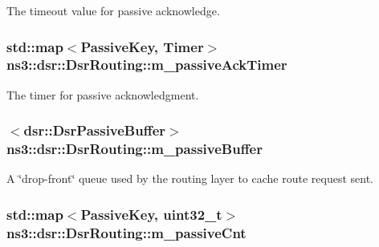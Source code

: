 The timeout value for passive acknowledge. 

\subsubsection[{\texorpdfstring{m\+\_\+passive\+Ack\+Timer}{m_passiveAckTimer}}]{\setlength{\rightskip}{0pt plus 5cm}std\+::map$<${\bf Passive\+Key}, {\bf Timer}$>$ ns3\+::dsr\+::\+Dsr\+Routing\+::m\+\_\+passive\+Ack\+Timer\hspace{0.3cm}{\ttfamily [private]}}\hypertarget{classns3_1_1dsr_1_1DsrRouting_ac53c706898e76a7f4871a460d13edd36}{}\label{classns3_1_1dsr_1_1DsrRouting_ac53c706898e76a7f4871a460d13edd36}


The timer for passive acknowledgment. 

\subsubsection[{\texorpdfstring{m\+\_\+passive\+Buffer}{m_passiveBuffer}}]{$<${\bf dsr\+::\+Dsr\+Passive\+Buffer}$>$ ns3\+::dsr\+::\+Dsr\+Routing\+::m\+\_\+passive\+Buffer\hspace{0.3cm}{\ttfamily [private]}}\hypertarget{classns3_1_1dsr_1_1DsrRouting_ac0404985fc04df7f5b8f53ff1e487079}{}\label{classns3_1_1dsr_1_1DsrRouting_ac0404985fc04df7f5b8f53ff1e487079}


A \char`\"{}drop-\/front\char`\"{} queue used by the routing layer to cache route request sent. 

\subsubsection[{\texorpdfstring{m\+\_\+passive\+Cnt}{m_passiveCnt}}]{\setlength{\rightskip}{0pt plus 5cm}std\+::map$<${\bf Passive\+Key}, uint32\+\_\+t$>$ ns3\+::dsr\+::\+Dsr\+Routing\+::m\+\_\+passive\+Cnt\hspace{0.3cm}{\ttfamily [private]}}\hypertarget{classns3_1_1dsr_1_1DsrRouting_a7fec404d680459aab2b40941a950502d}{}\label{classns3_1_1dsr_1_1DsrRouting_a7fec404d680459aab2b40941a950502d}


